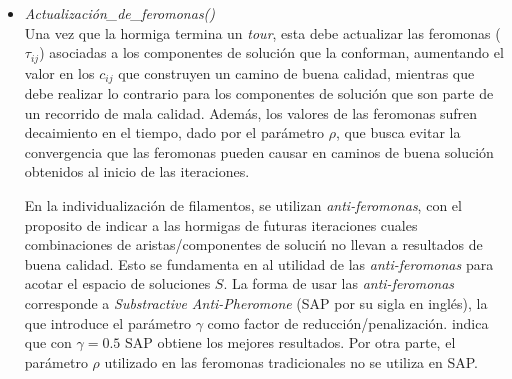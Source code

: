 \begin{itemize}
    Para la individualizaci\'on de filamentos, la evaluaci\'on global corresponde a eliminar soluciones candidatas que no aporten informaci\'on nueva. Sea $s_a$ y $s_b$ las soluciones de las hormigas $a$ y $b$ respectivamente. Si $s_a$ y $s_b$ cumplen con las siguientes condiciones:
    
    \begin{itemize}
        \item $\forall c_{ij} \in s_a \in [0, \theta]$ y $\forall c_{ij} \in s_b \in [0, \theta]$
        \item $\forall c_{ij} \in s_a$ fueron electos por la hormiga $a$ con $P(c_{ij} | s_{a}^{P}) = 1$ y $\forall c_{ij} \in s_b$ fueron electos por la hormiga $b$ con $P(c_{ij} | s_{b}^{P}) = 1$
        \item $s_a \subseteq s_b$
    \end{itemize}
    
    Se tiene que $s_a$ no aporta m\'as informaci\'on que $s_b$, por lo que $s_a$ puede descartarse. Se denomina a $s_b$ como un segmento, el cual se comporta como una secci\'on indivisible de filamento.
    
    
    
    \smallskip
    \item {\it Actualizaci\'on\_de\_feromonas()}\\
    Una vez que la hormiga termina un {\it tour}, esta debe actualizar las feromonas ($\tau_{ij}$) asociadas a los componentes de soluci\'on que la conforman, aumentando el valor en los $c_{ij}$ que construyen un camino de buena calidad, mientras que debe realizar lo contrario para los componentes de soluci\'on que son parte de un recorrido de mala calidad. Adem\'as, los valores de las feromonas sufren decaimiento en el tiempo, dado por el par\'ametro $\rho$, que busca evitar la convergencia que las feromonas pueden causar en caminos de buena soluci\'on obtenidos al inicio de las iteraciones.
    
    
    En la individualizaci\'on de filamentos, se utilizan {\it anti-feromonas}, con el proposito de indicar a las hormigas de futuras iteraciones cuales combinaciones de aristas/componentes de soluci\'n no llevan a resultados de buena calidad. Esto se fundamenta en al utilidad de las {\it anti-feromonas} para acotar el espacio de soluciones $S$. La forma de usar las {\it anti-feromonas} corresponde a {\it Substractive Anti-Pheromone} (SAP por su sigla en ingl\'es), la que introduce el par\'ametro $\gamma$ como factor de reducci\'on/penalizaci\'on. \cite{montgomery2002anti} indica que con $\gamma = 0.5$ SAP obtiene los mejores resultados. Por otra parte, el par\'ametro $\rho$ utilizado en las feromonas tradicionales no se utiliza en SAP.
    

\end{itemize}
